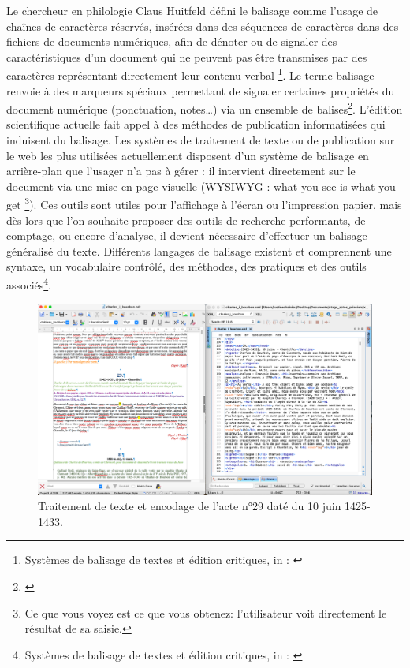 \par Le chercheur en philologie Claus Huitfeld défini le balisage comme \og l'usage de chaînes de caractères réservés, insérées dans des séquences de caractères dans des fichiers de documents numériques, afin de dénoter ou de signaler des caractéristiques d'un document qui ne peuvent pas être transmises par des caractères représentant directement leur contenu verbal \fg \footnote{\og Systèmes de balisage de textes et édition critiques\fg, in : \cite{apollonEditionCritiqueEre2017}}. Le terme balisage renvoie à des marqueurs spéciaux permettant de signaler certaines propriétés du document numérique (ponctuation, notes…) via un ensemble de balises\footnote{\cite{apollonEditionCritiqueEre2017}}. L’édition scientifique actuelle fait appel à des méthodes de publication informatisées qui induisent du balisage. Les systèmes de traitement de texte ou de publication sur le web les plus utilisées actuellement disposent d’un système de balisage en \og arrière-plan \fg \space que l'usager n'a pas à gérer : il intervient directement sur le document via une mise en page visuelle (WYSIWYG : \og what you see is what you get \fg\footnote{\og Ce que vous voyez est ce que vous obtenez\fg : l'utilisateur voit directement le résultat de sa saisie.}). Ces outils sont utiles pour l'affichage à l'écran ou l'impression papier, mais dès lors que l'on souhaite proposer des outils de recherche performants, de comptage, ou encore d'analyse, il devient nécessaire d'effectuer un balisage généralisé du texte. Différents langages de balisage existent et comprennent une syntaxe, un vocabulaire contrôlé, des méthodes, des pratiques et des outils associés\footnote{\og Systèmes de balisage de textes et édition critiques\fg, in : \cite{apollonEditionCritiqueEre2017}}. 
\newline 

\begin{figure}[ht]
    \centering
    \includegraphics[scale=0.3]{front/images/odt_vs_xml.png}
    \caption{Traitement de texte et encodage de l'acte n°29 daté du 10 juin 1425-1433.}
    \label{fig:odt_vs_xml}
\end{figure}
\newpage 


